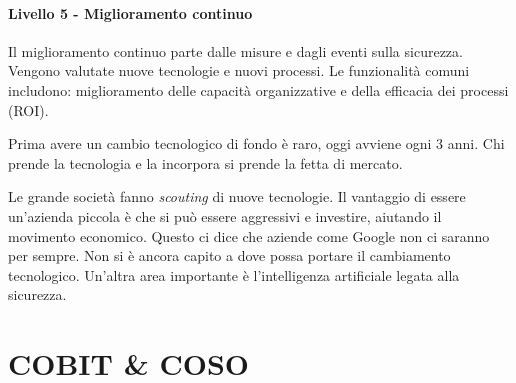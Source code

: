 \paragraph{Livello 5 - Miglioramento continuo}

Il miglioramento continuo parte dalle misure e dagli eventi sulla sicurezza.
Vengono valutate nuove tecnologie e nuovi processi. Le funzionalità comuni 
includono: miglioramento delle capacità organizzative e della efficacia dei 
processi (ROI).

Prima avere un cambio tecnologico di fondo è raro, oggi avviene ogni 3 anni. Chi 
prende la tecnologia e la incorpora si prende la fetta di mercato.

Le grande società fanno \textit{scouting} di nuove tecnologie. Il vantaggio di 
essere un'azienda piccola è che si può essere aggressivi e investire, aiutando 
il movimento economico. Questo ci dice che aziende come Google non ci 
saranno per sempre. Non si è ancora capito a dove possa portare il cambiamento
tecnologico. Un'altra area importante è l'intelligenza artificiale legata 
alla sicurezza.


\section{COBIT \& COSO}

